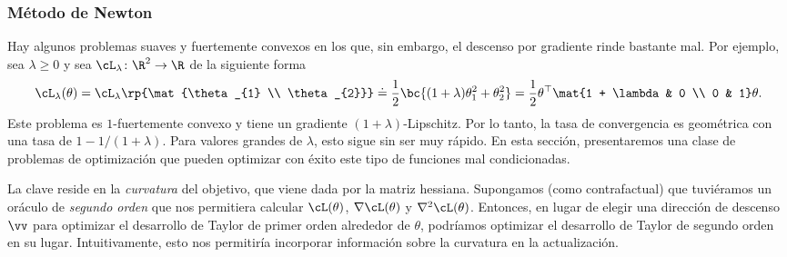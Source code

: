 \documentclass[../../book-main_es.tex]{subfiles}
\begin{document}
\subsubsection{Método de Newton}

Hay algunos problemas suaves y fuertemente convexos en los que,
sin embargo, el descenso por gradiente rinde bastante mal. Por ejemplo, sea
\(\lambda \geq 0\) y sea \(\cL_{\lambda} \colon \R^{2} \to \R\) de la siguiente forma
\begin{equation}
    \cL_{\lambda}(\theta) = \cL_{\lambda}\rp{\mat{\theta_{1}
    \\ \theta_{2}}} \doteq \frac{1}{2}\bc{(1 + \lambda)
    \theta_{1}^{2} + \theta_{2}^{2}} = \frac{1}{2}\theta^{\top}\mat{1
    + \lambda & 0 \\ 0 & 1}\theta.
\end{equation}
Este problema es \(1\)-fuertemente convexo y tiene un gradiente \((1 +
\lambda)\)-Lipschitz. Por lo tanto, la tasa de convergencia es geométrica
con una tasa de \(1 - 1/(1 + \lambda)\). Para valores grandes de \(\lambda\), esto
sigue sin ser muy rápido. En esta sección, presentaremos una clase de
problemas de optimización que pueden optimizar con éxito este tipo de
funciones mal condicionadas.

La clave reside en la \textit{curvatura} del objetivo, que viene dada por
la matriz hessiana. Supongamos (como contrafactual) que tuviéramos un
oráculo de \textit{segundo orden} que nos permitiera calcular
\(\cL(\theta)\), \(\nabla \cL(\theta)\) y
\(\nabla^{2}\cL(\theta)\). Entonces, en lugar de elegir una dirección de descenso
\(\vv\) para optimizar el desarrollo de Taylor de primer orden alrededor de
\(\theta\), podríamos optimizar el desarrollo de Taylor de segundo orden
en su lugar. Intuitivamente, esto nos permitiría incorporar información sobre la curvatura
en la actualización.
\end{document}
